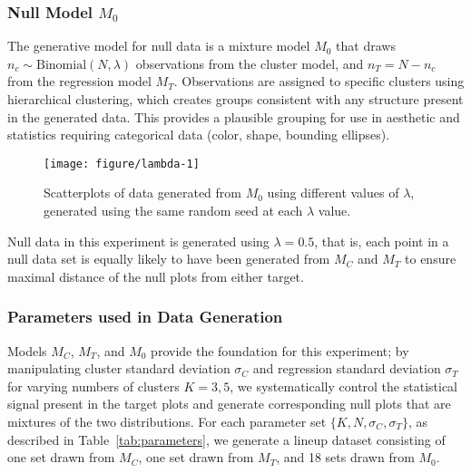 \documentclass[12pt]{article}\usepackage[]{graphicx}\usepackage[]{color}
\newenvironment{knitrout}{}{} %
\begin{document}
\subsubsection{Null Model \texorpdfstring{$M_0$}{M0}}
The generative model for null data is a mixture model $M_0$ that draws $n_c \sim \text{Binomial}(N, \lambda)$ observations from the cluster model, and $n_T = N - n_c$ from the regression model $M_T$. 
Observations are assigned to specific clusters using hierarchical clustering, which creates groups consistent with any structure present in the generated data. 
This provides a plausible grouping for use in aesthetic and statistics requiring categorical data (color, shape, bounding ellipses). 

\begin{figure}[hbt]
\begin{knitrout}
\color{fgcolor}

{\centering \texttt{[image: figure/lambda-1]} 

}



\end{knitrout}
\caption[Mixing parameter for null model $M_0$]{\label{fig:lambda} Scatterplots of data generated from $M_0$ using different values of $\lambda$, generated using the same random seed at each $\lambda$ value.}
\end{figure}

Null data in this experiment is generated using $\lambda = 0.5$, that is, each point in a null data set is equally likely to have been generated from $M_C$ and $M_T$ to ensure maximal distance of the null plots from either target. 

\subsubsection{Parameters used in Data Generation}
Models $M_C$, $M_T$, and $M_0$ provide the foundation for this experiment; by manipulating cluster standard deviation $\sigma_C$ and regression standard deviation $\sigma_T$ for varying numbers of clusters $K=3, 5$, we  systematically control the statistical signal present in the target plots and generate corresponding null plots that are mixtures of the two distributions. 
For each parameter set $\{K, N, \sigma_C, \sigma_T\}$, as described in Table~\ref{tab:parameters}, we  generate a lineup dataset consisting of one set drawn from $M_C$, one set drawn from $M_T$, and 18 sets drawn from $M_0$. 
\end{document}
